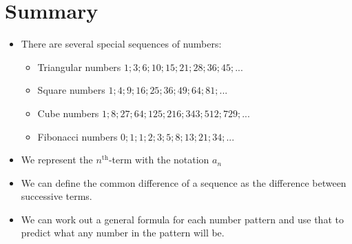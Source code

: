             \section{ Summary}
            \nopagebreak
            \label{m39362*uid08213123}\begin{itemize}[noitemsep]
            \item There are several special sequences of numbers: \label{m39362*uid8271312}\begin{itemize}[noitemsep]
            \item Triangular numbers  $1;3;6;10;15;21;28;36;45;...$\item Square numbers $1;4;9;16;25;36;49;64;81;...$\item Cube numbers $1;8;27;64;125;216;343;512;729;...$\item Fibonacci numbers $0;1;1;2;3;5;8;13;21;34;...$\end{itemize}
        \item We represent the ${n}^{\mathrm{th}}$-term with the notation ${a}_{n}$\item We can define the common difference of a sequence as the difference between successive terms.\item We can work out a general formula for each number pattern and use that to predict what any number in the pattern will be.\end{itemize}
        \label{m39362*cid5}
